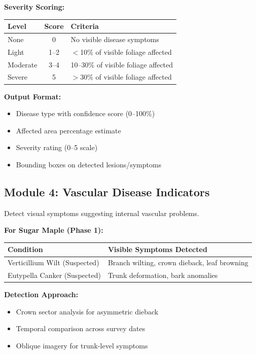 \documentclass[11pt,a4paper]{article}
\begin{document}
\textbf{Severity Scoring:}
\begin{center}
\begin{tabular}{lcp{6cm}}
\toprule
\textbf{Level} & \textbf{Score} & \textbf{Criteria} \\
\midrule
None & 0 & No visible disease symptoms \\
Light & 1--2 & $<$10\% of visible foliage affected \\
Moderate & 3--4 & 10--30\% of visible foliage affected \\
Severe & 5 & $>$30\% of visible foliage affected \\
\bottomrule
\end{tabular}
\end{center}

\textbf{Output Format:}
\begin{itemize}[leftmargin=*]
\item Disease type with confidence score (0--100\%)
\item Affected area percentage estimate
\item Severity rating (0--5 scale)
\item Bounding boxes on detected lesions/symptoms
\end{itemize}

\subsection{Module 4: Vascular Disease Indicators}

Detect visual symptoms suggesting internal vascular problems.

\textbf{For Sugar Maple (Phase 1):}
\begin{center}
\begin{tabular}{ll}
\toprule
\textbf{Condition} & \textbf{Visible Symptoms Detected} \\
\midrule
Verticillium Wilt (Suspected) & Branch wilting, crown dieback, leaf browning \\
Eutypella Canker (Suspected) & Trunk deformation, bark anomalies \\
\bottomrule
\end{tabular}
\end{center}

\textbf{Detection Approach:}
\begin{itemize}[leftmargin=*]
\item Crown sector analysis for asymmetric dieback
\item Temporal comparison across survey dates
\item Oblique imagery for trunk-level symptoms
\end{itemize}
\end{document}
